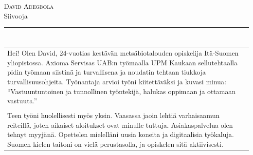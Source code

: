 \documentclass[a4paper,11pt]{article}
\begin{document}
\small
\setlength{\cvlabelw}{3.9cm}
\titlespacing{\section}{0pt}{0.55em}{2pt}

\begin{cvheader}
\par{\centering
		{\Huge \textsc{David Adegbola}}\\[0.4em]
		{\Large Siivooja}
	\bigskip\par}

\hrule
\vspace{0.5em}
\end{cvheader}

\section{}
\begin{tabular}{p{}}
 Hei! Olen David, 24-vuotias kestävän metsäbiotalouden opiskelija Itä-Suomen yliopistossa. Axioma Servisas UAB:n työmaalla UPM Kaukaan sellutehtaalla pidin työmaan siistinä ja turvallisena ja noudatin tehtaan tiukkoja turvallisuusohjeita. Työnantaja arvioi työni kiitettäväksi ja kuvasi minua: ``Vastuuntuntoinen ja tunnollinen työntekijä, halukas oppimaan ja ottamaan vastuuta.''\\\\

 Teen työni huolellisesti myös yksin. Vaasassa jaoin lehtiä varhaisaamun reiteillä, joten aikaiset aloitukset ovat minulle tuttuja. Asiakaspalvelua olen tehnyt myyjänä. Opettelen mielelläni uusia koneita ja digitaalisia työkaluja. Suomen kielen taitoni on vielä perustasolla, ja opiskelen sitä aktiivisesti.
\end{tabular}

\section{}
\end{document}
